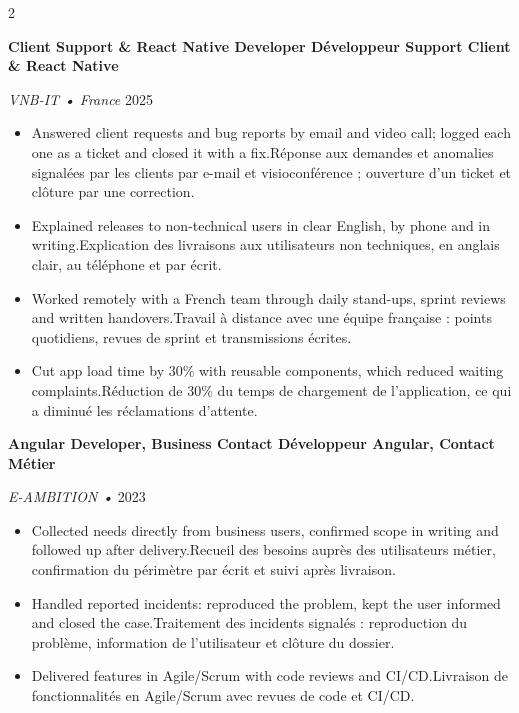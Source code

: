 \documentclass[10pt,a4paper]{article}
\begin{document}
\begin{paracol}{2}

\textbf{
{Client Support \& React Native Developer}
{Développeur Support Client \& React Native}
}

\textit{VNB-IT • France}
\hfill
2025

\begin{itemize}
\item {}
{Answered client requests and bug reports by email and video call; logged each one as a ticket and closed it with a fix.}{Réponse aux demandes et anomalies signalées par les clients par e-mail et visioconférence ; ouverture d'un ticket et clôture par une correction.}
\item {}
{Explained releases to non-technical users in clear English, by phone and in writing.}{Explication des livraisons aux utilisateurs non techniques, en anglais clair, au téléphone et par écrit.}
\item {}
{Worked remotely with a French team through daily stand-ups, sprint reviews and written handovers.}{Travail à distance avec une équipe française : points quotidiens, revues de sprint et transmissions écrites.}
\item {}
{Cut app load time by 30\% with reusable components, which reduced waiting complaints.}{Réduction de 30\% du temps de chargement de l'application, ce qui a diminué les réclamations d'attente.}
\end{itemize}

\vspace{0.7em}


\textbf{
{Angular Developer, Business Contact}
{Développeur Angular, Contact Métier}
}

\textit{E-AMBITION • }
\hfill
2023

\begin{itemize}
\item {}
{Collected needs directly from business users, confirmed scope in writing and followed up after delivery.}{Recueil des besoins auprès des utilisateurs métier, confirmation du périmètre par écrit et suivi après livraison.}
\item {}
{Handled reported incidents: reproduced the problem, kept the user informed and closed the case.}{Traitement des incidents signalés : reproduction du problème, information de l'utilisateur et clôture du dossier.}
\item {}
{Delivered features in Agile/Scrum with code reviews and CI/CD.}{Livraison de fonctionnalités en Agile/Scrum avec revues de code et CI/CD.}
\end{itemize}


\end{paracol}
\end{document}
